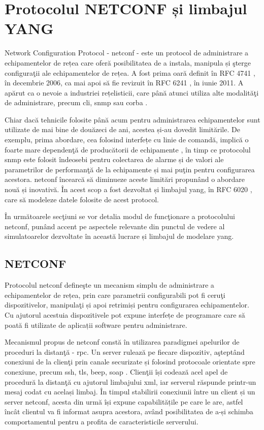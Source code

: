 \section{Protocolul NETCONF și limbajul YANG}

Network Configuration Protocol - \gls{netconf} - este un protocol de administrare a echipamentelor de rețea care oferă posibilitatea de a instala, manipula și şterge configuraţii ale echipamentelor de rețea. A fost prima oară definit în RFC 4741 \cite{rfc4741}, în decembrie 2006, ca mai apoi să fie revizuit în RFC 6241 \cite{rfc6241}, în iunie 2011. A apărut ca o nevoie a industriei rețelisticii, care până atunci utiliza alte modalităţi de administrare, precum \gls{cli}, \gls{snmp} sau \gls{corba} \cite{yu2010empirical}.

Chiar dacă tehnicile folosite până acum pentru administrarea echipamentelor sunt utilizate de mai bine de douăzeci de ani, acestea și-au dovedit limitările. De exemplu, prima abordare, cea folosind interfețe cu linie de comandă, implică o foarte mare dependenţă de producătorii de echipamente \cite{elbadawi2011improving}, în timp ce protocolul \gls{snmp} este folosit îndeosebi pentru colectarea de alarme și de valori ale parametrilor de performanţă de la echipamente și mai puţin pentru configurarea acestora. \gls{netconf} încearcă să diminueze aceste limitări propunând o abordare nouă și inovativă. În acest scop a fost dezvoltat și limbajul \gls{yang}, în RFC 6020 \cite{rfc6020}, care să modeleze datele folosite de acest protocol.

În următoarele secţiuni se vor detalia modul de funcţionare a protocolului \gls{netconf}, punând accent pe aspectele relevante din punctul de vedere al simulatoarelor dezvoltate în această lucrare și limbajul de modelare \gls{yang}.

\subsection{NETCONF}

Protocolul \gls{netconf} defineşte un mecanism simplu de administrare a echipamentelor de rețea, prin care parametrii configurabili pot fi ceruţi dispozitivelor, manipulaţi și apoi retrimiși pentru configurarea echipamentelor. Cu ajutorul acestuia dispozitivele pot expune interfețe de programare care să poată fi utilizate de aplicații software pentru administrare.

Mecanismul propus de \gls{netconf} constă în utilizarea paradigmei apelurilor de proceduri la distanţă - \gls{rpc}. Un server rulează pe fiecare dispozitiv, aşteptând conexiuni de la clienţi prin canale securizate și folosind protocoale orientate spre conexiune, precum \gls{ssh}, \gls{tls}, \gls{beep}, \gls{soap} \cite{ji2009challenges}. Clienţii își codează acel apel de procedură la distanţă cu ajutorul limbajului \gls{xml}, iar serverul răspunde printr-un mesaj codat cu același limbaj. În timpul stabilirii conexiunii între un client și un server \gls{netconf}, acesta din urmă își expune capabilitățile pe care le are, astfel încât clientul va fi informat asupra acestora, având posibilitatea de a-și schimba comportamentul pentru a profita de caracteristicile serverului.

